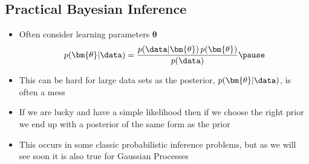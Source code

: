 \begin{slide}
\section{Practical Bayesian Inference}
 
\begin{PauseHighLight}
  \begin{itemize}
  \item Often consider learning parameters $\bm{\theta}$
    \begin{align*}
      p(\bm{\theta}|\data) =
      \frac{p(\data|\bm{\theta})\,p(\bm{\theta})}{p(\data)}\pause
    \end{align*}
  \item This can be hard for large data sets as the posterior,
    $p(\bm{\theta}|\data)$, is often a mess\pause
  \item If we are lucky and have a simple likelihood then if we choose
    the right prior we end up with a posterior of the same form as the
    prior\pause
  \item This occurs in some classic probabilistic inference problems,
    but as we will see soon it is also true for Gaussian Processes\pause
  \end{itemize}
\end{PauseHighLight}

\end{slide}



\Outline %

